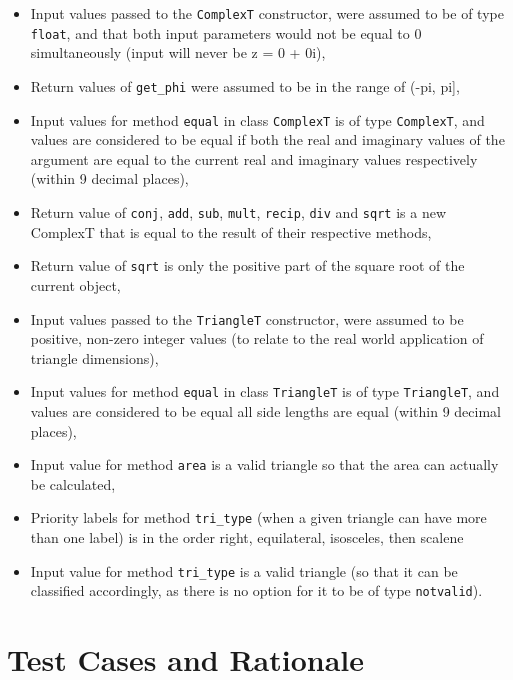 \documentclass[12pt]{article}
\begin{document}
\begin{itemize}
        \item Input values passed to the \verb|ComplexT| constructor, were 
        assumed to be of type \verb|float|, and that both input parameters 
        would not be equal to 0 simultaneously (input will never be z = 0 + 0i),
        \item Return values of \verb|get_phi| were assumed to be in the range 
        of (-pi, pi],
        \item Input values for method \verb|equal| in class \verb|ComplexT| is 
        of type \verb|ComplexT|, and values are considered to be equal if both 
        the real and imaginary values of the argument are equal to the current 
        real and imaginary values respectively (within 9 decimal places),
        \item Return value of \verb|conj|, \verb|add|, \verb|sub|, \verb|mult|, 
        \verb|recip|, \verb|div| and \verb|sqrt| is a new ComplexT that is 
        equal to the result of their respective methods,
        \item Return value of \verb|sqrt| is only the positive part of the square 
        root of the current object, 
        \item Input values passed to the \verb|TriangleT| constructor, were 
        assumed to be positive, non-zero integer values (to relate to the real 
        world application of triangle dimensions),
        \item Input values for method \verb|equal| in class \verb|TriangleT| is 
        of type \verb|TriangleT|, and values are considered to be equal all side 
        lengths are equal (within 9 decimal places),
        \item Input value for method \verb|area| is a valid triangle so that the 
        area can actually be calculated, 
        \item Priority labels for method \verb|tri_type| (when a given triangle 
        can have more than one label) is in the order right, equilateral, 
        isosceles, then scalene
        \item Input value for method \verb|tri_type| is a valid triangle (so 
        that it can be classified accordingly, as there is no option for it 
        to be of type \verb|notvalid|).
\end{itemize}

\section{Test Cases and Rationale} \label{Testing}
\end{document}
